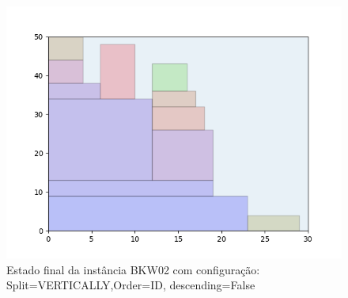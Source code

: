 \begin{figure}[H]
    \centering
    \caption[]{Estado final da instância BKW02 com configuração: Split=VERTICALLY,Order=ID, descending=False}
    \label{fig:bkw02-vertically-id-false}
    \includegraphics[scale=0.5]{output/figures/bkw/bkw02/vertically/id/false/00}
\end{figure}